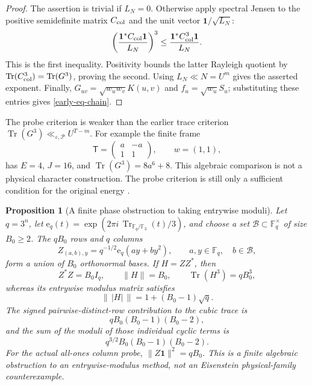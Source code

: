 \documentclass[11pt]{article}
\newtheorem{proposition}[theorem]{Proposition}
\theoremstyle{definition}
\newcommand{\eps}{\varepsilon}
\newcommand{\lls}{\ll_{\eps,\mathcal P}}
\begin{document}
\begin{proof}
The assertion is trivial if \(L_N=0\).  Otherwise apply spectral Jensen
to the positive semidefinite matrix \(C_{\rm col}\) and the unit vector
\(\mathbf1/\sqrt{L_N}\):
\[
 \left(\frac{\mathbf1^*C_{\rm col}\mathbf1}{L_N}\right)^3
      \le\frac{\mathbf1^*C_{\rm col}^3\mathbf1}{L_N}.
\]
This is the first inequality.  Positivity bounds the latter Rayleigh
quotient by \(\operatorname{Tr}(C_{\rm col}^3)
=\operatorname{Tr}(G^3)\), proving the second.
Using \(L_N\ll N=U^m\) gives the asserted exponent.
Finally, \(G_{uv}=\sqrt{w_uw_v}K(u,v)\) and
\(f_u=\sqrt{w_u}S_u\); substituting these entries gives
\eqref{early-eq-chain}.
\end{proof}

The probe criterion is weaker than the earlier trace criterion
\(\operatorname{Tr}(G^3)\lls U^{T-m}\).
For example the finite frame
\[
 \mathsf T=\begin{pmatrix}a&-a\\1&1\end{pmatrix},\qquad w=(1,1),
\]
has \(E=4\), \(J=16\), and \(\operatorname{Tr}(G^3)=8a^6+8\).
This algebraic comparison is not a physical character construction.
The probe criterion is still only a sufficient condition for the
original energy \cite{n3,n5}.

\begin{proposition}[A finite phase obstruction to taking entrywise moduli]
\label{early-prop-phase-obstruction}
Let \(q=3^n\), let
\(\mathrm e_q(t)=\exp(2\pi i\,\operatorname{Tr}_{\mathbb F_q/\mathbb F_3}(t)/3)\),
and choose a set \(\mathcal B\subset\mathbb F_q^\times\) of size
\(B_0\ge2\).  The \(qB_0\) rows and \(q\) columns
\[
 Z_{(a,b),y}=q^{-1/2}\mathrm e_q(ay+by^2),
 \qquad a,y\in\mathbb F_q,\quad b\in\mathcal B,
\]
form a union of \(B_0\) orthonormal bases.  If \(H=ZZ^*\), then
\[
 Z^*Z=B_0I_q,\qquad
 \|H\|=B_0,\qquad
 \operatorname{Tr}(H^3)=qB_0^3,
\]
whereas its entrywise modulus matrix satisfies
\[
 \bigl\|\,|H|\,\bigr\|=1+(B_0-1)\sqrt q.
\]
The signed pairwise-distinct-row contribution to the cubic trace is
\[
 qB_0(B_0-1)(B_0-2),
\]
and the sum of the moduli of those individual cyclic terms is
\[
 q^{3/2}B_0(B_0-1)(B_0-2).
\]
For the actual all-ones column probe, \(\|Z\mathbf1\|^2=qB_0\).
This is a finite algebraic obstruction to an entrywise-modulus method,
not an Eisenstein physical-family counterexample.
\end{proposition}
\end{document}
